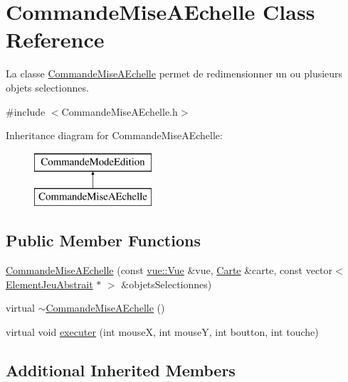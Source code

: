 \hypertarget{class_commande_mise_a_echelle}{\section{Commande\-Mise\-A\-Echelle Class Reference}
\label{class_commande_mise_a_echelle}
}


La classe \hyperlink{class_commande_mise_a_echelle}{Commande\-Mise\-A\-Echelle} permet de redimensionner un ou plusieurs objets selectionnes.  




{\ttfamily \#include $<$Commande\-Mise\-A\-Echelle.\-h$>$}

Inheritance diagram for Commande\-Mise\-A\-Echelle\-:\begin{figure}[H]
\begin{center}
\leavevmode
\includegraphics[height=2.000000cm]{class_commande_mise_a_echelle}
\end{center}
\end{figure}
\subsection*{Public Member Functions}
\begin{DoxyCompactItemize}
\item 
\hyperlink{class_commande_mise_a_echelle_a9b855e25dc10ed0893a8de09d305b436}{Commande\-Mise\-A\-Echelle} (const \hyperlink{classvue_1_1_vue}{vue\-::\-Vue} \&vue, \hyperlink{class_carte}{Carte} \&carte, const vector$<$ \hyperlink{class_element_jeu_abstrait}{Element\-Jeu\-Abstrait} $\ast$ $>$ \&objets\-Selectionnes)
\item 
virtual \hyperlink{class_commande_mise_a_echelle_a7cb0c5c9155f30b96ee3b8a82e014fd7}{$\sim$\-Commande\-Mise\-A\-Echelle} ()
\item 
virtual void \hyperlink{class_commande_mise_a_echelle_a03aabe2e5d3a20928b041cfe5595715b}{executer} (int mouse\-X, int mouse\-Y, int boutton, int touche)
\end{DoxyCompactItemize}
\subsection*{Additional Inherited Members}


